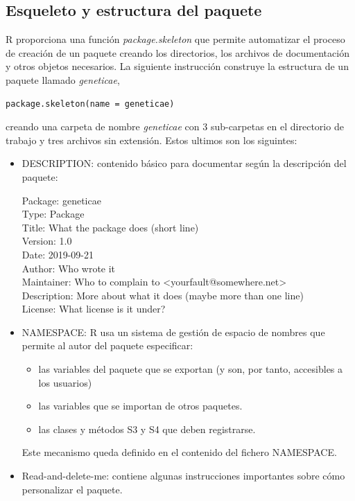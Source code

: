 \subsection{Esqueleto y estructura del paquete}
R proporciona una función \emph{package.skeleton} que permite automatizar el proceso de creación de un paquete creando los directorios, los archivos de documentación y otros objetos necesarios.
La  siguiente instrucción construye la estructura de un paquete llamado \emph{geneticae}, 

\begin{lstlisting}[frame=single]
package.skeleton(name = geneticae)
\end{lstlisting}

creando una carpeta de nombre \emph{geneticae} con 3 sub-carpetas en el directorio de trabajo y tres archivos sin extensión. Estos ultimos son los siguintes: 
\begin{itemize}

\item DESCRIPTION: contenido básico para
documentar según la descripción del paquete:

Package: geneticae\\
Type: Package\\
Title: What the package does (short line)\\
Version: 1.0\\
Date: 2019-09-21\\
Author: Who wrote it\\
Maintainer: Who to complain to <yourfault@somewhere.net>\\
Description: More about what it does (maybe more than one line)\\
License: What license is it under?\\

\item NAMESPACE: R usa un sistema de gestión de espacio de nombres que permite al autor del paquete especificar:
\begin{itemize}
\item las variables del paquete que se exportan (y son, por tanto, accesibles a los usuarios)
\item las variables que se importan de otros paquetes.
\item las clases y métodos S3 y S4 que deben registrarse.
\end{itemize}

Este mecanismo queda definido en el contenido del fichero NAMESPACE.

\item Read-and-delete-me: contiene algunas instrucciones importantes sobre cómo personalizar el paquete.
\end{itemize}

